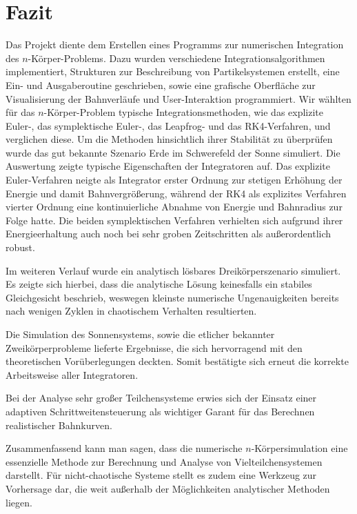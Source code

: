 \section{Fazit} %
\label{sec:fazit}

  Das Projekt diente dem Erstellen eines Programms zur numerischen Integration des $n$-Körper-Problems.
  Dazu wurden verschiedene Integrationsalgorithmen implementiert, Strukturen zur Beschreibung von Partikelsystemen erstellt, eine Ein- und Ausgaberoutine geschrieben, sowie eine grafische Oberfläche zur Visualisierung der Bahnverläufe und User-Interaktion programmiert.
  Wir wählten für das $n$-Körper-Problem typische Integrationsmethoden, wie das explizite Euler-, das symplektische Euler-, das Leapfrog- und das RK4-Verfahren, und verglichen diese.
  Um die Methoden hinsichtlich ihrer Stabilität zu überprüfen wurde das gut bekannte Szenario Erde im Schwerefeld der Sonne simuliert.
  Die Auswertung zeigte typische Eigenschaften der Integratoren auf.
  Das explizite Euler-Verfahren neigte als Integrator erster Ordnung zur stetigen Erhöhung der Energie und damit Bahnvergrößerung, während der RK4 als explizites Verfahren vierter Ordnung eine kontinuierliche Abnahme von Energie und Bahnradius zur Folge hatte.
  Die beiden symplektischen Verfahren verhielten sich aufgrund ihrer Energieerhaltung auch noch bei sehr groben Zeitschritten als außerordentlich robust.

  Im weiteren Verlauf wurde ein analytisch lösbares Dreikörperszenario simuliert.
  Es zeigte sich hierbei, dass die analytische Lösung keinesfalls ein stabiles Gleichgesicht beschrieb, weswegen kleinste numerische Ungenauigkeiten bereits nach wenigen Zyklen in chaotischem Verhalten resultierten.

  Die Simulation des Sonnensystems, sowie die etlicher bekannter Zweikörperprobleme lieferte Ergebnisse, die sich hervorragend mit den theoretischen Vorüberlegungen deckten. Somit bestätigte sich erneut die korrekte Arbeitsweise aller Integratoren.

  Bei der Analyse sehr großer Teilchensysteme erwies sich der Einsatz einer adaptiven Schrittweitensteuerung als wichtiger Garant für das Berechnen realistischer Bahnkurven.

  Zusammenfassend kann man sagen, dass die numerische $n$-Körpersimulation eine essenzielle Methode zur Berechnung und Analyse von Vielteilchensystemen darstellt.
  Für nicht-chaotische Systeme stellt es zudem eine Werkzeug zur Vorhersage dar, die weit außerhalb der Möglichkeiten analytischer Methoden liegen.



